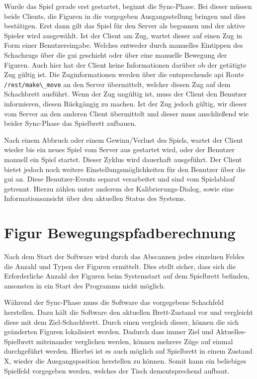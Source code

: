 Wurde das Spiel gerade erst gestartet, beginnt die Sync-Phase. Bei
dieser müssen beide Clients, die Figuren in die vorgegeben
Ausgangsstellung bringen und dies bestätigen. Erst dann gilt das Spiel
für den Server als begonnen und der aktive Spieler wird ausgewählt. Ist
der Client am Zug, wartet dieser auf einen Zug in Form einer
Benutzereingabe. Welches entweder durch manuelles Eintippen des
Schachzugs über die \gls{gui} geschieht oder über eine manuelle Bewegung
der Figuren. Auch hier hat der Client keine Informationen darüber ob der
getätigte Zug gültig ist. Die Zuginformationen werden über die
entsprechende \gls{api} Route \passthrough{\lstinline!/rest/make\_move!}
an den Server übermittelt, welcher diesen Zug auf dem Schachbrett
ausführt. Wenn der Zug ungültig ist, muss der Client den Benutzer
informieren, diesen Rückgängig zu machen. Ist der Zug jedoch gültig, wir
dieser vom Server an den anderen Client übermittelt und dieser muss
anschließend wie beider Sync-Phase das Spielbrett aufbauen.

Nach einem Abbruch oder einem Gewinn/Verlust des Spiels, wartet der
Client wieder bis ein neues Spiel vom Server aus gestartet wird, oder
der Benutzer manuell ein Spiel startet. Dieser Zyklus wird dauerhaft
ausgeführt. Der Client bietet jedoch noch weitere
Einstellungsmöglichkeiten für den Benutzer über die \gls{gui} an. Diese
Benutzer-Events separat verarbeitet und sind vom Spielablauf getrennt.
Hierzu zählen unter anderem der Kalibrierungs-Dialog, sowie eine
Informationsansicht über den aktuellen Status des Systems.

\hypertarget{figur-bewegungspfadberechnung}{%
\section{Figur
Bewegungspfadberechnung}\label{figur-bewegungspfadberechnung}}

Nach dem Start der Software wird durch das Abscannen jedes einzelnen
Feldes die Anzahl und Typen der Figuren ermittelt. Dies stellt sicher,
dass sich die Erforderliche Anzahl der Figuren beim Systemstart auf dem
Spielbrett befinden, ansonsten in ein Start des Programms nicht möglich.

Während der Sync-Phase muss die Software das vorgegebene Schachfeld
herstellen. Dazu hält die Software den aktuellen Brett-Zustand vor und
vergleicht diese mit dem Ziel-Schachbrett. Durch einen vergleich dieser,
können die sich geänderten Figuren lokalisiert werden. Dadurch dass
immer Ziel und Aktuelles-Spielbrett miteinander verglichen werden,
können mehrere Züge auf einmal durchgeführt werden. Hierbei ist es auch
möglich auf Spielbrett in einem Zustand X, wieder die Ausgangsposition
herstellen zu können. Somit kann ein beliebiges Spielfeld vorgegeben
werden, welches der Tisch dementsprechend aufbaut.


